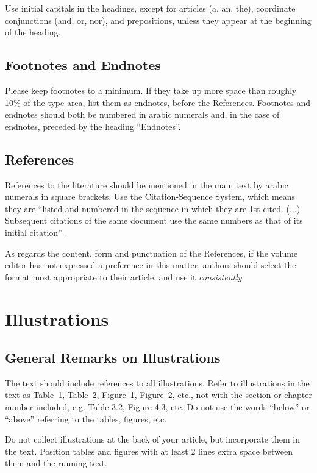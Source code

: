 \documentclass{IOS-Book-Article}
\begin{document}
Use initial capitals in the headings, except for articles (a, an, the), coordinate
conjunctions (and, or, nor), and prepositions, unless they appear at the beginning
of the heading.

\subsection{Footnotes and Endnotes}
Please keep footnotes to a minimum. If they take up more space than roughly 10\% of
the type area, list them as endnotes, before the References. Footnotes and endnotes
should both be numbered in arabic numerals and, in the case of endnotes, preceded by
the heading ``Endnotes''.

\subsection{References}

References to the literature should be mentioned in the main text by arabic numerals in
square brackets. Use the Citation-Sequence System, which means they are ``listed and
numbered in the sequence in which they are 1st cited. ($\ldots$) Subsequent citations of the
same document use the same numbers as that of its initial citation'' \cite{r1}.

As regards the content, form and punctuation of the References, if the volume
editor has not expressed a preference in this matter, authors should select the format
most appropriate to their article, and use it \textit{consistently}.

\section{Illustrations}

\subsection{General Remarks on Illustrations}
The text should include references to all illustrations. Refer to illustrations in the
text as Table~1, Table~2, Figure~1, Figure~2, etc., not with the section or chapter number
included, e.g. Table 3.2, Figure 4.3, etc. Do not use the words ``below'' or ``above''
referring to the tables, figures, etc.

Do not collect illustrations at the back of your article, but incorporate them in the
text. Position tables and figures with at least 2 lines
extra space between them and the running text.
\end{document}
